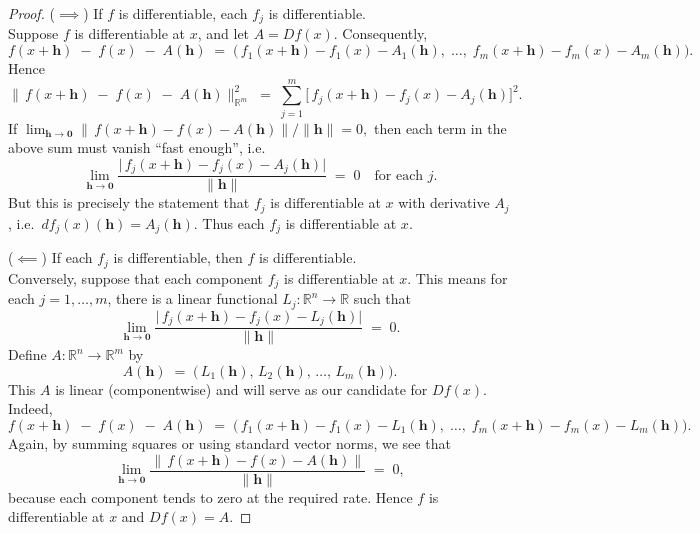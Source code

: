 \documentclass[11pt]{article}
\begin{document}
\begin{exercise}{2}
    \begin{proof}
 ($\implies$) If $f$ is differentiable, each $f_j$ is differentiable.\\
Suppose $f$ is differentiable at $x$, and let $A= Df(x)$.  Consequently,
\[
f(x+\mathbf{h}) \;-\; f(x)\;-\; A(\mathbf{h})
\;=\;
\bigl(\,
f_1(x+\mathbf{h})-f_1(x)-A_1(\mathbf{h}),\;\dots,\;
f_m(x+\mathbf{h})-f_m(x)-A_m(\mathbf{h})
\bigr).
\]
Hence 
\[
\bigl\|\,f(x+\mathbf{h}) \;-\; f(x)\;-\; A(\mathbf{h})\bigr\|_{\mathbb{R}^m}^2
\;=\;
\sum_{j=1}^m
\bigl[\,
f_j(x+\mathbf{h})-f_j(x)-A_j(\mathbf{h})
\bigr]^2.
\]
If 
\(\lim_{\mathbf{h}\to \mathbf{0}}\|\,f(x+\mathbf{h}) - f(x) - A(\mathbf{h})\|/\|\mathbf{h}\|=0,\)
then each term in the above sum must vanish ``fast enough'', i.e.
\[
\lim_{\mathbf{h}\to\mathbf{0}}
\frac{
\bigl|\,
f_j(x+\mathbf{h})-f_j(x)-A_j(\mathbf{h})
\bigr|
}{\|\mathbf{h}\|}
\;=\;
0
\quad\text{for each }j.
\]
But this is precisely the statement that $f_j$ is differentiable at $x$ 
with derivative $A_j$, i.e.\ $df_j(x)(\mathbf{h}) = A_j(\mathbf{h})$.  
Thus each $f_j$ is differentiable at $x$.

($\impliedby$) If each $f_j$ is differentiable, then $f$ is differentiable.\\
Conversely, suppose that each component $f_j$ is differentiable at $x$.  
This means for each $j=1,\dots,m$, there is a linear functional 
$L_j:\mathbb{R}^n \to \mathbb{R}$ such that
\[
\lim_{\mathbf{h}\to\mathbf{0}}
\frac{\bigl|\,f_j(x+\mathbf{h})-f_j(x)-L_j(\mathbf{h})\bigr|}
{\|\mathbf{h}\|}
\;=\;0.
\]
Define $A:\mathbb{R}^n\to\mathbb{R}^m$ by
\[
A(\mathbf{h})
\;=\;
\bigl(\,L_1(\mathbf{h}),\,L_2(\mathbf{h}),\,\ldots,\,L_m(\mathbf{h})\bigr).
\]
This $A$ is linear (componentwise) and will serve as our candidate for $Df(x)$.  
Indeed,
\[
f(x+\mathbf{h}) \;-\; f(x)\;-\; A(\mathbf{h})
\;=\;
\bigl(\,
f_1(x+\mathbf{h})-f_1(x)-L_1(\mathbf{h}),\;\dots,\;
f_m(x+\mathbf{h})-f_m(x)-L_m(\mathbf{h})
\bigr).
\]
Again, by summing squares or using standard vector norms, we see that 
\[
\lim_{\mathbf{h}\to\mathbf{0}}
\frac{\|\,f(x+\mathbf{h}) - f(x) - A(\mathbf{h})\|}{\|\mathbf{h}\|}
\;=\;
0,
\]
because each component tends to zero at the required rate.  
Hence $f$ is differentiable at $x$ and $Df(x)=A$.
    \end{proof}
\end{exercise}
\end{document}
